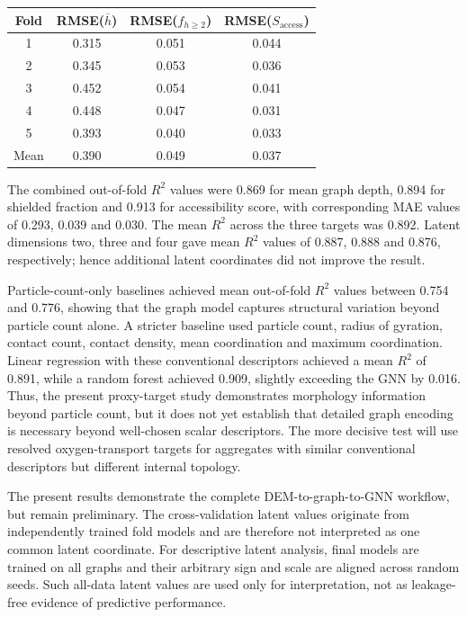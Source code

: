 \begin{center}
\begin{tabular}{|c|c|c|c|}
\hline
Fold & RMSE($\overline{h}$) & RMSE($f_{h\geq2}$) & RMSE($S_{\mathrm{access}}$) \\
\hline
1 & 0.315 & 0.051 & 0.044 \\
2 & 0.345 & 0.053 & 0.036 \\
3 & 0.452 & 0.054 & 0.041 \\
4 & 0.448 & 0.047 & 0.031 \\
5 & 0.393 & 0.040 & 0.033 \\
\hline
Mean & 0.390 & 0.049 & 0.037 \\
\hline
\end{tabular}
\end{center}

The combined out-of-fold $R^2$ values were 0.869 for mean graph depth, 0.894
for shielded fraction and 0.913 for accessibility score, with corresponding
MAE values of 0.293, 0.039 and 0.030. The mean $R^2$ across the three targets
was 0.892. Latent dimensions two, three and four gave mean $R^2$ values of
0.887, 0.888 and 0.876, respectively; hence additional latent coordinates did
not improve the result.

Particle-count-only baselines achieved mean out-of-fold $R^2$ values between
0.754 and 0.776, showing that the graph model captures structural variation
beyond particle count alone. A stricter baseline used particle count, radius
of gyration, contact count, contact density, mean coordination and maximum
coordination. Linear regression with these conventional descriptors achieved
a mean $R^2$ of 0.891, while a random forest achieved 0.909, slightly exceeding
the GNN by 0.016. Thus, the present proxy-target study demonstrates morphology
information beyond particle count, but it does not yet establish that detailed
graph encoding is necessary beyond well-chosen scalar descriptors. The more
decisive test will use resolved oxygen-transport targets for aggregates with
similar conventional descriptors but different internal topology.

The present results demonstrate the complete DEM-to-graph-to-GNN workflow, but
remain preliminary. The cross-validation latent values originate from
independently trained fold models and are therefore not interpreted as one
common latent coordinate. For descriptive latent analysis, final models are
trained on all graphs and their arbitrary sign and scale are aligned across
random seeds. Such all-data latent values are used only for interpretation,
not as leakage-free evidence of predictive performance.
